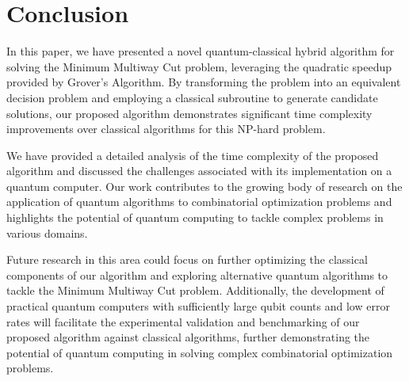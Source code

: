 \section{Conclusion}
\label{sec:conclusion}
In this paper, we have presented a novel quantum-classical hybrid algorithm for solving the Minimum Multiway Cut problem, leveraging the quadratic speedup provided by Grover's Algorithm. By transforming the problem into an equivalent decision problem and employing a classical subroutine to generate candidate solutions, our proposed algorithm demonstrates significant time complexity improvements over classical algorithms for this NP-hard problem.

We have provided a detailed analysis of the time complexity of the proposed algorithm and discussed the challenges associated with its implementation on a quantum computer. Our work contributes to the growing body of research on the application of quantum algorithms to combinatorial optimization problems and highlights the potential of quantum computing to tackle complex problems in various domains.

Future research in this area could focus on further optimizing the classical components of our algorithm and exploring alternative quantum algorithms to tackle the Minimum Multiway Cut problem. Additionally, the development of practical quantum computers with sufficiently large qubit counts and low error rates will facilitate the experimental validation and benchmarking of our proposed algorithm against classical algorithms, further demonstrating the potential of quantum computing in solving complex combinatorial optimization problems.

